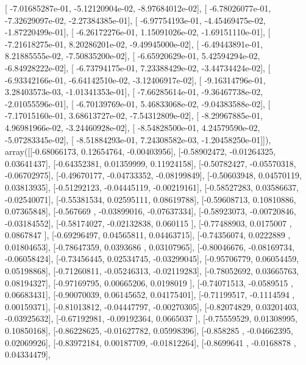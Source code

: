 \documentclass{article}
\begin{document}
       [ -7.01685287e-01,  -5.12120904e-02,  -8.97684012e-02],
       [ -6.78026077e-01,  -7.32629097e-02,  -2.27384385e-01],
       [ -6.97754193e-01,  -4.45469475e-02,  -1.87220499e-01],
       [ -6.26172276e-01,   1.15091026e-02,  -1.69151110e-01],
       [ -7.21618275e-01,   8.20286201e-02,  -9.49945000e-02],
       [ -6.49443891e-01,   8.21885555e-02,  -7.50835200e-02],
       [ -6.65920629e-01,   5.42594294e-02,  -6.84928222e-02],
       [ -6.73794175e-01,   7.23388429e-02,  -3.44734424e-02],
       [ -6.93342166e-01,  -6.64142510e-02,  -3.12406917e-02],
       [ -9.16314796e-01,   3.28403573e-03,  -1.01341353e-01],
       [ -7.66285614e-01,  -9.36467738e-02,  -2.01055596e-01],
       [ -6.70139769e-01,   5.46833068e-02,  -9.04383588e-02],
       [ -7.17015160e-01,   3.68613727e-02,  -7.54312809e-02],
       [ -8.29967885e-01,   4.96981966e-02,  -3.24460928e-02],
       [ -8.54828500e-01,   4.24579590e-02,  -5.07283345e-02],
       [ -8.51884293e-01,   7.24308582e-03,  -1.20458250e-01]]), array([[-0.68066173,  0.12654764, -0.00403956],
       [-0.58902472, -0.01264325,  0.03641437],
       [-0.64352381,  0.01359999,  0.11924158],
       [-0.50782427, -0.05570318, -0.06702975],
       [-0.49670177, -0.04733352, -0.08199849],
       [-0.50603948,  0.04570119,  0.03813935],
       [-0.51292123, -0.04445119, -0.00219161],
       [-0.58527283,  0.03586637, -0.02540071],
       [-0.55381534,  0.02595111,  0.08619788],
       [-0.59608713,  0.10810886,  0.07365848],
       [-0.567669  , -0.03899016, -0.07637334],
       [-0.58923073, -0.00720846, -0.03184552],
       [-0.58174027, -0.02132838,  0.060115  ],
       [-0.77488903,  0.0175007 ,  0.0867847 ],
       [-0.69296497,  0.04565811,  0.04463715],
       [-0.74356074,  0.0222889 ,  0.01804653],
       [-0.78647359,  0.0393686 ,  0.03107965],
       [-0.80046676, -0.08169734, -0.06058424],
       [-0.73456445,  0.02534745, -0.03299045],
       [-0.95706779,  0.06054459,  0.05198868],
       [-0.71260811, -0.05246313, -0.02119283],
       [-0.78052692,  0.03665763,  0.08194327],
       [-0.97169795,  0.00665206,  0.0198019 ],
       [-0.74071513, -0.0589515 ,  0.06683431],
       [-0.90070039,  0.06145652,  0.04175401],
       [-0.71199517, -0.1114594 ,  0.00159371],
       [-0.81013812, -0.04447797, -0.00270305],
       [-0.82074829,  0.03201403, -0.03925632],
       [-0.67192981, -0.09192364,  0.0665037 ],
       [-0.75559529,  0.01308995,  0.10850168],
       [-0.86228625, -0.01627782,  0.05998396],
       [-0.858285  , -0.04662395,  0.02069926],
       [-0.83972184,  0.00187709, -0.01812264],
       [-0.8699641 , -0.0168878 ,  0.04334479],
\end{document}
